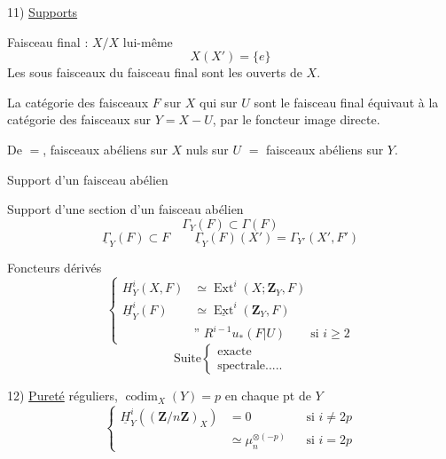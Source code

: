 
11) \uline{Supports}

 Faisceau final : $X/X$ lui-même
\[X(X')=\{e\}\]
Les sous faisceaux du faisceau final sont les ouverts de $X$.

La catégorie des faisceaux $F$ sur $X$ qui sur $U$ sont le faisceau final équivaut à la catégorie des faisceaux sur $Y=X-U$, par le foncteur image directe.

De $=$, faisceaux abéliens sur $X$ nuls sur $U$ $=$ faisceaux abéliens sur $Y$.

Support d'un faisceau abélien

Support d'une section d'un faisceau abélien
\[
\Gamma_Y(F)\subset\Gamma(F)
\]
\[
\underline\Gamma_Y(F)\subset F
\qquad
\underline\Gamma_Y(F)(X')=\Gamma_{Y'}(X',F')
\]

Foncteurs dérivés
\[
\left\{\begin{aligned}
H^i_Y(X,F)&\simeq\operatorname{Ext}^i(X;\mathbf Z_Y,F)\\
\underline H^i_Y(F)&\simeq\underline{\operatorname{Ext}}^i(\mathbf Z_Y,F)\\
&\text{'' } R^{i-1}u_*(F|U)\qquad\text{si }i\geq2
\end{aligned}\right.
\]
\[
\text{Suite}\left\{\begin{array}{l}\text{exacte}\\\text{spectrale.....}\end{array}\right.
\]

12) \uline{Pureté}
réguliers, $\operatorname{codim}_X(Y)=p$ en chaque pt de $Y$
\[
\left\{\begin{aligned}
\underline H^i_Y((\mathbf Z/n\mathbf Z)_X)&=0&&\text{si }i\neq2p\\
&\simeq\mu_n^{\otimes(-p)}&&\text{si }i=2p
\end{aligned}\right.
\]
